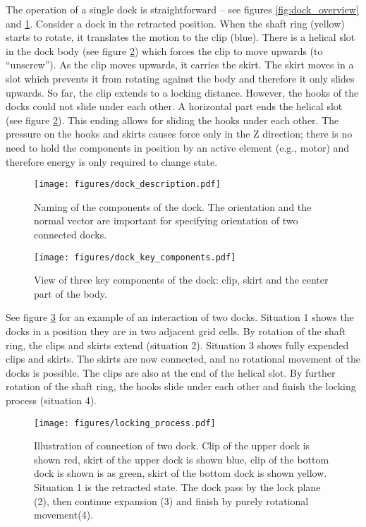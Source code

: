 The operation of a single dock is straightforward -- see figures
\ref{fig:dock_overview} and \ref{fig:dock_description}. Consider a dock in the
retracted position. When the shaft ring (yellow) starts to rotate, it translates
the motion to the clip (blue). There is a helical slot in the dock body (see
figure \ref{fig:dock_key_components}) which forces the clip to move upwards (to
``unscrew''). As the clip moves upwards, it carries the skirt. The skirt moves
in a slot which prevents it from rotating against the body and therefore it only
slides upwards. So far, the clip extends to a locking distance. However, the
hooks of the docks could not slide under each other. A horizontal part ends the
helical slot (see figure \ref{fig:dock_key_components}). This ending allows for
sliding the hooks under each other. The pressure on the hooks and skirts causes
force only in the Z direction; there is no need to hold the components in
position by an active element (e.g., motor) and therefore energy is only
required to change state.

\begin{figure}[t]
    \centering
    \texttt{[image: figures/dock\_description.pdf]}
    \caption{Naming of the components of the dock. The orientation and the
    normal vector are important for specifying orientation of two connected
    docks. }
    \label{fig:dock_description}
\end{figure}

\begin{figure}[t]
    \centering
    \texttt{[image: figures/dock\_key\_components.pdf]}
    \caption{View of three key components of the dock: clip, skirt and the
    center part of the body.}
    \label{fig:dock_key_components}
\end{figure}

See figure \ref{fig:dock_locking_process} for an example of an interaction of
two docks. Situation 1 shows the docks in a position they are in two adjacent
grid cells. By rotation of the shaft ring, the clips and skirts extend
(situation 2). Situation 3 shows fully expended clips and skirts. The skirts are
now connected, and no rotational movement of the docks is possible. The clips
are also at the end of the helical slot. By further rotation of the shaft ring,
the hooks slide under each other and finish the locking process (situation 4).

\begin{figure}[!ht]
    \centering
    \texttt{[image: figures/locking\_process.pdf]}
    \caption{Illustration of connection of two dock. Clip of the upper dock is
    shown red, skirt of the upper dock is shown blue, clip of the bottom dock is
    shown is as green, skirt of the bottom dock is shown yellow.  Situation 1 is
    the retracted state. The dock pass by the lock plane (2), then continue
    expansion (3) and finish by purely rotational movement(4). }
    \label{fig:dock_locking_process}
\end{figure}

